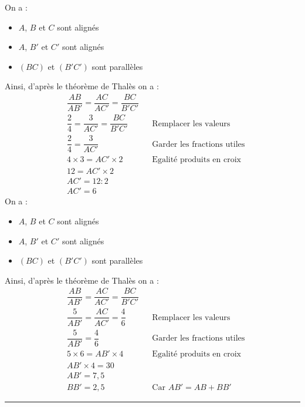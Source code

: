 \begin{multicols}{2}
    \exo{}{} On a :
    \begin{itemize}
      \item $A$, $B$ et $C$ sont alignés
      \item $A$, $B'$ et $C'$ sont alignés
      \item $(BC)$ et $(B'C')$ sont parallèles
    \end{itemize}
    Ainsi, d'après le théorème de Thalès on a :
    \begin{align*}
      &\dfrac{AB}{AB'}=\dfrac{AC}{AC'}=\dfrac{BC}{B'C'}&&\\
      &\dfrac{2}{4}=\dfrac{3}{AC'}=\dfrac{BC}{B'C'}&&\text{Remplacer les valeurs}\\
      &\dfrac{2}{4}=\dfrac{3}{AC'}&&\text{Garder les fractions utiles}\\
      &4\times 3=AC'\times 2 &&\text{Egalité produits en croix}\\
      &12=AC'\times 2 &&\\
      &AC'=12:2&&\\
      &AC'=6&&
    \end{align*}
    \exo{}{} On a :
    \vspace{-1em} %
    \begin{itemize}
      \item $A$, $B$ et $C$ sont alignés
      \item $A$, $B'$ et $C'$ sont alignés
      \item $(BC)$ et $(B'C')$ sont parallèles
    \end{itemize}
    Ainsi, d'après le théorème de Thalès on a :
    \begin{align*}
      &\dfrac{AB}{AB'}=\dfrac{AC}{AC'}=\dfrac{BC}{B'C'}&&\\
      &\dfrac{5}{AB'}=\dfrac{AC}{AC'}=\dfrac{4}{6}&&\text{Remplacer les valeurs}\\
      &\dfrac{5}{AB'}=\dfrac{4}{6} &&\text{Garder les fractions utiles}\\
      &5\times 6=AB'\times 4&&\text{Egalité produits en croix}\\
      &AB'\times 4=30 &&\\
      &AB'=7,5 &&\\
      &BB'=2,5&&\text{Car }AB'=AB+BB'
    \end{align*}
  \end{multicols}
\hrule \vspace{-0.5em}%
